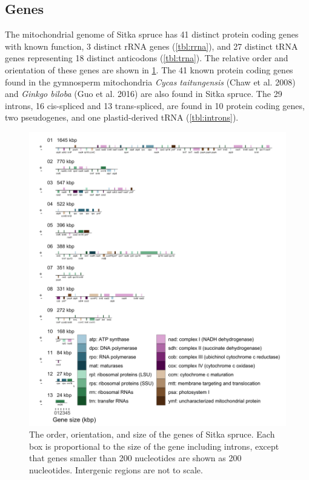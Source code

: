\documentclass[
  12pt,
  oneside,
  openany]{book}
\begin{document}
\hypertarget{genes}{%
\subsection{Genes}\label{genes}}

The mitochondrial genome of Sitka spruce has 41 distinct protein coding genes with known function, 3 distinct rRNA genes (\cref{tbl:rrna}), and 27 distinct tRNA genes representing 18 distinct anticodons (\cref{tbl:trna}). The relative order and orientation of these genes are shown in \cref{fig:genes}. The 41 known protein coding genes found in the gymnosperm mitochondria \emph{Cycas taitungensis} (Chaw et al. 2008) and \emph{Ginkgo biloba} (Guo et al. 2016) are also found in Sitka spruce. The 29 introns, 16 cis-spliced and 13 trans-spliced, are found in 10 protein coding genes, two pseudogenes, and one plastid-derived tRNA (\cref{tbl:introns}).

\begin{figure}
\hypertarget{fig:genes}{%
\centering
\includegraphics{psitchensismt/genes.png}
\caption[The order, orientation, and size of the genes of Sitka spruce.]{The order, orientation, and size of the genes of Sitka spruce. Each box is proportional to the size of the gene including introns, except that genes smaller than 200 nucleotides are shown as 200 nucleotides. Intergenic regions are not to scale.}\label{fig:genes}
}
\end{figure}
\end{document}
